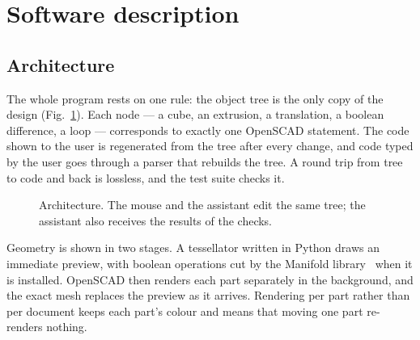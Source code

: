 \documentclass[preprint,12pt]{elsarticle}
\begin{document}
\section{Software description}

\subsection{Architecture}

The whole program rests on one rule: the object tree is the only copy of the design (Fig.~\ref{fig:arch}). Each node --- a cube, an extrusion, a translation, a boolean difference, a loop --- corresponds to exactly one OpenSCAD statement. The code shown to the user is regenerated from the tree after every change, and code typed by the user goes through a parser that rebuilds the tree. A round trip from tree to code and back is lossless, and the test suite checks it.

\begin{figure}[t]
\centering
{}
\caption{Architecture. The mouse and the assistant edit the same tree; the assistant also receives the results of the checks.}
\label{fig:arch}
\end{figure}

Geometry is shown in two stages. A tessellator written in Python draws an immediate preview, with boolean operations cut by the Manifold library~\cite{manifold} when it is installed. OpenSCAD then renders each part separately in the background, and the exact mesh replaces the preview as it arrives. Rendering per part rather than per document keeps each part's colour and means that moving one part re-renders nothing.
\end{document}
